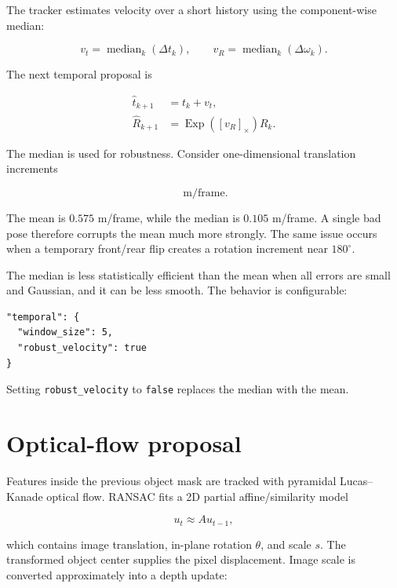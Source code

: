 \documentclass[11pt]{article}
\newcommand{\Exp}{\operatorname{Exp}}
\newcommand{\median}{\operatorname{median}}
\begin{document}
The tracker estimates velocity over a short history using the component-wise
median:

\begin{equation}
v_t=\median_k(\Delta t_k),
\qquad
v_R=\median_k(\Delta\omega_k).
\end{equation}

The next temporal proposal is

\begin{align}
\widehat t_{k+1}&=t_k+v_t,\\
\widehat R_{k+1}&=\Exp([v_R]_\times)R_k.
\end{align}

The median is used for robustness. Consider one-dimensional translation
increments

\begin{equation}
[0.10,\;0.11,\;0.09,\;2.00]\;\text{m/frame}.
\end{equation}

The mean is $0.575$ m/frame, while the median is $0.105$ m/frame. A single bad
pose therefore corrupts the mean much more strongly. The same issue occurs
when a temporary front/rear flip creates a rotation increment near
$180^\circ$.

The median is less statistically efficient than the mean when all errors are
small and Gaussian, and it can be less smooth. The behavior is configurable:

\begin{verbatim}
"temporal": {
  "window_size": 5,
  "robust_velocity": true
}
\end{verbatim}

Setting \texttt{robust\_velocity} to \texttt{false} replaces the median with
the mean.

\section{Optical-flow proposal}

Features inside the previous object mask are tracked with pyramidal
Lucas--Kanade optical flow. RANSAC fits a 2D partial affine/similarity model

\begin{equation}
u_t\approx Au_{t-1},
\end{equation}

which contains image translation, in-plane rotation $\theta$, and scale $s$.
The transformed object center supplies the pixel displacement. Image scale is
converted approximately into a depth update:
\end{document}
